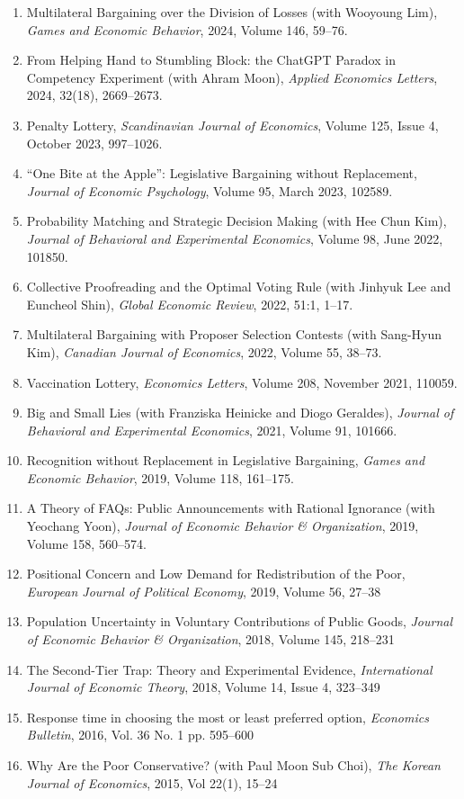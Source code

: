 \documentclass[margin, a4paper]{res}
\begin{document}
\begin{resume}
\begin{enumerate}[leftmargin=*]
\item Multilateral Bargaining over the Division of Losses (with Wooyoung Lim), \emph{Games and Economic Behavior}, 2024, Volume 146, 59--76.
\item From Helping Hand to Stumbling Block: the ChatGPT Paradox in Competency Experiment (with Ahram Moon), \emph{Applied Economics Letters}, 2024, 32(18), 2669--2673.
\item Penalty Lottery, \emph{Scandinavian Journal of Economics}, Volume 125, Issue 4, October 2023, 997--1026.
\item ``One Bite at the Apple'': Legislative Bargaining without Replacement, \emph{Journal of Economic Psychology}, Volume 95, March 2023, 102589.
\item Probability Matching and Strategic Decision Making (with Hee Chun Kim), \emph{Journal of Behavioral and Experimental Economics}, Volume 98, June 2022, 101850.
\item Collective Proofreading and the Optimal Voting Rule (with Jinhyuk Lee and Euncheol Shin), \emph{Global Economic Review}, 2022, 51:1, 1--17.
\item Multilateral Bargaining with Proposer Selection Contests (with Sang-Hyun Kim), \emph{Canadian Journal of Economics}, 2022, Volume 55, 38--73.
\item Vaccination Lottery, \emph{Economics Letters}, Volume 208, November 2021, 110059.
\item Big and Small Lies (with Franziska Heinicke and Diogo Geraldes), \emph{Journal of Behavioral and Experimental Economics}, 2021, Volume 91, 101666.
\item Recognition without Replacement in Legislative Bargaining, \emph{Games and Economic Behavior}, 2019, Volume 118, 161--175.
\item A Theory of FAQs: Public Announcements with Rational Ignorance (with Yeochang Yoon), \emph{Journal of Economic Behavior \& Organization}, 2019, Volume 158, 560--574.
\item Positional Concern and Low Demand for Redistribution of the Poor, \emph{European Journal of Political Economy}, 2019, Volume 56, 27--38
\item Population Uncertainty in Voluntary Contributions of Public Goods, \emph{Journal of Economic Behavior \& Organization}, 2018, Volume 145, 218--231
\item The Second-Tier Trap: Theory and Experimental Evidence, \emph{International Journal of Economic Theory}, 2018, Volume 14, Issue 4, 323--349
\item Response time in choosing the most or least preferred option, \textit{Economics Bulletin}, 2016, Vol. 36 No. 1 pp. 595--600
\item Why Are the Poor Conservative? (with Paul Moon Sub Choi), \textit{The Korean Journal of Economics}, 2015, Vol 22(1), 15--24
\end{enumerate}


\end{resume}
\end{document}
